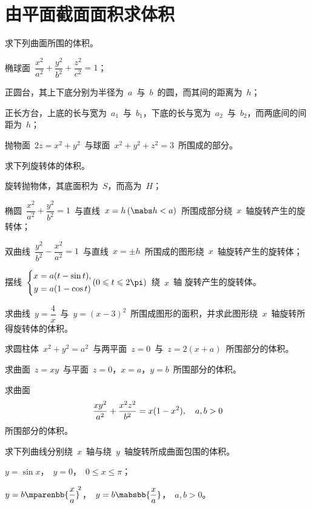 \section{由平面截面面积求体积}
\begin{exercise}
\item 求下列曲面所围的体积。
\begin{exlist}
  \item 椭球面~$\dfrac{x^2}{a^2}+\dfrac{y^2}{b^2}+\dfrac{z^2}{c^2}=1$；
  \item 正圆台，其上下底分别为半径为~$a$~与~$b$~的圆，而其间的距离为~$h$；
  \item 正长方台，上底的长与宽为~$a_1$~与~$b_1$，下底的长与宽为~$a_2$~与~$b_2$，而两底间的间距为~$h$；
  \item 抛物面~$2z=x^2+y^2$~与球面~$x^2+y^2+z^2=3$~所围成的部分。
\end{exlist}
\item 求下列旋转体的体积。
\begin{exlist}
  \item 旋转抛物体，其底面积为~$S$，而高为~$H$；
  \item 椭圆~$\dfrac{x^2}{a^2}+\dfrac{y^2}{b^2}=1$~与直线~$x=h\mcond{\mabs h<a}$~所围成部分绕~$x$~轴旋转产生的旋转体；
  \item 双曲线~$\dfrac{y^2}{b^2}-\dfrac{x^2}{a^2}=1$~与直线~$x=\pm h$~所围成的图形绕~$x$~轴旋转产生的旋转体；
  \item 摆线~$\Biggl\lbrace\begin{aligned}x&=a(t-\sin t),\\ y&=a(1-\cos t)\end{aligned}\mcond{0\leq t\leq 2\pi}$~绕~$x$~轴
  旋转产生的旋转体。
\end{exlist}
\item 求曲线~$y=\dfrac4x$~与~$y=(x-3)^2$~所围成图形的面积，并求此图形绕~$x$~轴旋转所得旋转体的体积。
\item 求圆柱体~$x^2+y^2=a^2$~与两平面~$z=0$~与~$z=2(x+a)$~所围部分的体积。
\item 求曲面~$z=xy$~与平面~$z=0$，$x=a$，$y=b$~所围部分的体积。
\item 求曲面
\[
  \dfrac{xy^2}{a^2}+\dfrac{x^2z^2}{b^2}=x(1-x^2)\mcond*{a,b>0}
\]
所围部分的体积。
\item 求下列曲线分别绕~$x$~轴与绕~$y$~轴旋转所成曲面包围的体积。
\begin{exlistcols}
  \item $y=\sin x$，~$y=0$，~$0\leq x\leq\pi$；
  \item $y=b\mparenbb{\dfrac xa}^{\msp 2}$，~$y=b\mabsbb{\dfrac xa}$，~$a,b>0$。
\end{exlistcols}
\end{exercise}

